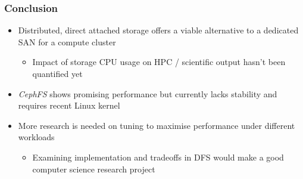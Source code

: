 \documentclass[handout]{beamer}
\begin{document}
\begin{frame}
\frametitle{Conclusion}
\begin{itemize}
\item Distributed, direct attached storage offers a viable alternative to a dedicated SAN for a compute cluster
\pause
\begin{itemize}
\item Impact of storage CPU usage on HPC / scientific output hasn't been quantified yet
\end{itemize}
\pause
\item \emph{CephFS} shows promising performance but currently lacks stability and requires recent Linux kernel
\pause 
\item More research is needed on tuning to maximise performance under different workloads
\pause
\begin{itemize}
\item Examining implementation and tradeoffs in DFS would make a good computer science research project
\end{itemize}
\end{itemize}

\end{frame}
\end{document}
